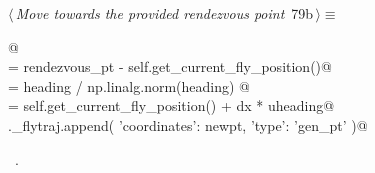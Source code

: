 \documentclass[11.5pt]{report}
\begin{document}
\vspace{-0.8cm} \newchunk {}
\begin{flushleft} \small
\begin{minipage}{\linewidth}\label{scrap121}\raggedright\small
{} $\langle\,${\itshape Move towards the provided rendezvous point}\nobreak\ {\footnotesize {79b}}$\,\rangle\equiv$
\vspace{-1ex}
\begin{list}{}{} \item
\mbox{}\verb@   @\\
\mbox{}\verb@heading  = rendezvous_pt - self.get_current_fly_position()@\\
\mbox{}\verb@uheading = heading / np.linalg.norm(heading) @\\
\mbox{}\verb@newpt    = self.get_current_fly_position() + dx * uheading@\\
\mbox{}\verb@self._flytraj.append(  {'coordinates': newpt, 'type': 'gen_pt'}  )@\\
\mbox{}\verb@@{\NWsep}
\end{list}
\vspace{-1.5ex}
\footnotesize
\begin{list}{}{\setlength{\itemsep}{-\parsep}\setlength{\itemindent}{-\leftmargin}}
\item \NWtxtMacroRefIn\ .

\item{}
\end{list}
\end{minipage}\vspace{4ex}
\end{flushleft}
\end{document}
